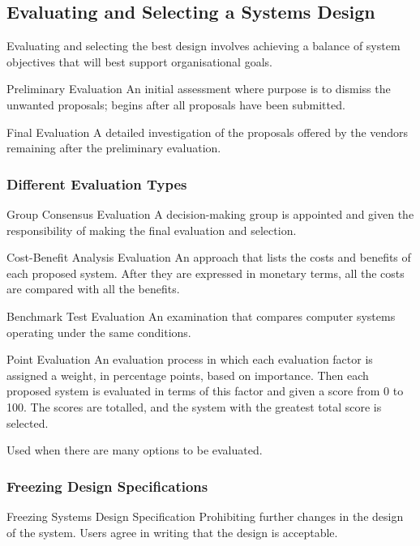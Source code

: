 \documentclass[\main/notes.tex]{subfiles}
\begin{document}
			\subsection{Evaluating and Selecting a Systems Design}
				Evaluating and selecting the best design involves achieving a balance of system objectives that will best support organisational goals.
				\begin{definition}{Preliminary Evaluation}
					An initial assessment where purpose is to dismiss the unwanted proposals; begins after all proposals have been submitted.
				\end{definition}
				\begin{definition}{Final Evaluation}
					A detailed investigation of the proposals offered by the vendors remaining after the preliminary evaluation.
				\end{definition}
				\subsubsection{Different Evaluation Types}
					\begin{definition}{Group Consensus Evaluation}
						A decision-making group is appointed and given the responsibility of making the final evaluation and selection.
					\end{definition}
					\begin{definition}{Cost-Benefit Analysis Evaluation}
						An approach that lists the costs and benefits of each proposed system. After they are expressed in monetary terms, all the costs are compared with all the benefits.
					\end{definition}
					\begin{definition}{Benchmark Test Evaluation}
						An examination that compares computer systems operating under the same conditions.
					\end{definition}
					\begin{definition}{Point Evaluation}
						An evaluation process in which each evaluation factor is assigned a weight, in percentage points, based on importance. Then each proposed system is evaluated in terms of this factor and given a score from 0 to 100. The scores are totalled, and the system with the greatest total score is selected.

						Used when there are many options to be evaluated.
					\end{definition}
				\subsubsection{Freezing Design Specifications}
					\begin{definition}{Freezing Systems Design Specification}
						Prohibiting further changes in the design of the system. Users agree in writing that the design is acceptable.
					\end{definition}
\end{document}

